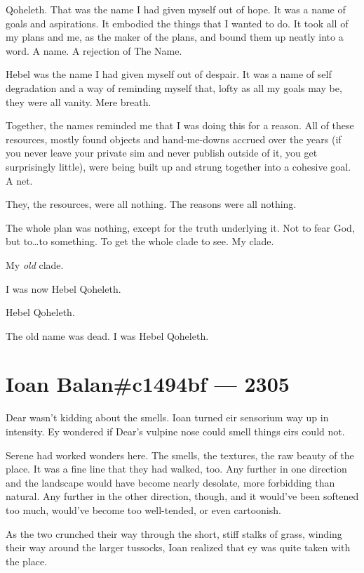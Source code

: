 Qoheleth. That was the name I had given myself out of hope. It was a name of goals and aspirations. It embodied the things that I wanted to do. It took all of my plans and me, as the maker of the plans, and bound them up neatly into a word. A name. A rejection of The Name.

Hebel was the name I had given myself out of despair. It was a name of self degradation and a way of reminding myself that, lofty as all my goals may be, they were all vanity. Mere breath.

Together, the names reminded me that I was doing this for a reason. All of these resources, mostly found objects and hand-me-downs accrued over the years (if you never leave your private sim and never publish outside of it, you get surprisingly little), were being built up and strung together into a cohesive goal. A net.

They, the resources, were all nothing. The reasons were all nothing.

The whole plan was nothing, except for the truth underlying it. Not to fear God, but to\ldots{}to something. To get the whole clade to see. My clade.

My \emph{old} clade.

I was now Hebel Qoheleth.

Hebel Qoheleth.

The old name was dead. I was Hebel Qoheleth.


\chapter*{Ioan Balan\#c1494bf — 2305}

Dear wasn't kidding about the smells. Ioan turned eir sensorium way up in intensity. Ey wondered if Dear's vulpine nose could smell things eirs could not.

Serene had worked wonders here. The smells, the textures, the raw beauty of the place. It was a fine line that they had walked, too. Any further in one direction and the landscape would have become nearly desolate, more forbidding than natural. Any further in the other direction, though, and it would've been softened too much, would've become too well-tended, or even cartoonish.

As the two crunched their way through the short, stiff stalks of grass, winding their way around the larger tussocks, Ioan realized that ey was quite taken with the place.

